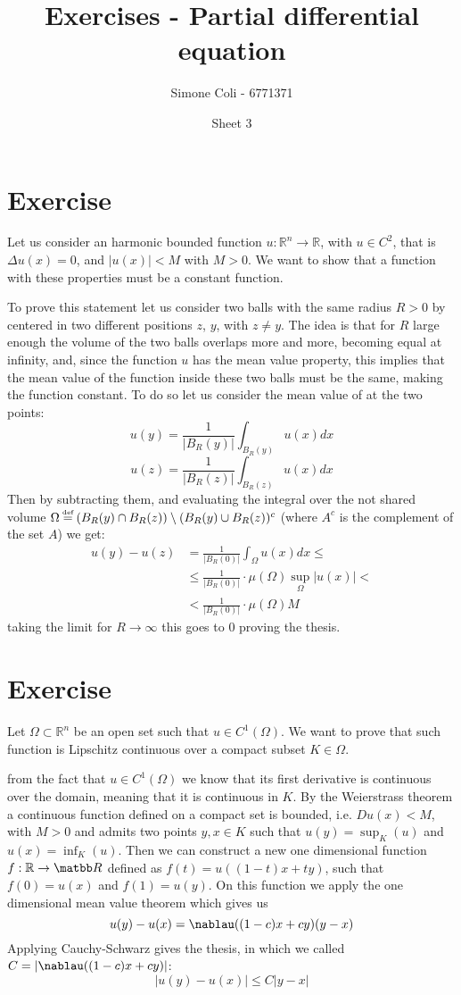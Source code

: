\documentclass{article}
\title{Exercises - Partial differential equation}
\author{Simone Coli - 6771371}
\date{Sheet 3}
\newcommand*{\eqdef}{\ensuremath{\overset{\mathclap{\text{\tiny def}}}{=}}}
\begin{document}
\maketitle
\section{Exercise}
Let us consider an harmonic bounded function $u: \mathbb R^n \to \mathbb R$, with $u \in C^2$, that is $\Delta u(x) = 0$, and $|u(x)|< M$ with $M>0$. We want to show that a function with these properties must be a constant function.

To prove this statement let us consider two balls with the same radius $R>0$ by centered in two different positions $z$, $y$, with $z \neq y$. The idea is that for $R$ large enough the volume of the two balls overlaps more and more, becoming equal at infinity, and, since the function $u$ has the mean value property, this implies that the mean value of the function inside these two balls must be the same, making the function constant. To do so let us consider the mean value of at the two points:
\[
    u(y) = \frac{1}{\left| B_R(y) \right|} \int_{B_R(y)} u(x) dx
\]
\[
    u(z) = \frac{1}{\left| B_R(z) \right|} \int_{B_R(z)} u(x) dx
\]
Then by subtracting them, and evaluating the integral over the not shared volume $\Omega \eqdef (B_R(y) \cap B_R(z)) \setminus (B_R(y)\cup B_R(z))^c$ (where $A^c$ is the complement of the set $A$) we get:
\[
    \begin{split}
        u(y)- u(z) &= \frac{1}{\left| B_R(0) \right|} \int_{\Omega} u(x) dx \leq\\
        & \leq \frac{1}{\left| B_R(0) \right|} \cdot \mu(\Omega) \sup_{\Omega}|u(x)|<\\
        & < \frac{1}{\left| B_R(0) \right|} \cdot \mu(\Omega) M
    \end{split}
\]
taking the limit for $R \to \infty$ this goes to $0$ proving the thesis.

\section{Exercise}
Let $\Omega \subset \mathbb R^n$ be an open set such that $u \in C^1(\Omega)$. We want to prove that such function is Lipschitz continuous over a compact subset $K \in \Omega$.

from the fact that $u \in C^1(\Omega)$ we know that its first derivative is continuous over the domain, meaning that it is continuous in $K$. By the Weierstrass theorem a continuous function defined on a compact set is bounded, i.e. $Du(x) < M$, with $M>0$ and admits two points $y, x \in K$ such that $ u(y) = \sup_K (u)$ and $u(x)=\inf_K(u)$. Then we can construct a new one dimensional function $f : \mathbb R \to \matbb R$ defined as $f(t) = u((1-t)x + ty)$, such that $f(0) = u(x)$ and $f(1)= u(y)$. On this function we apply the one dimensional mean value theorem which gives us
\[
    u(y) - u(x) = \nablau((1-c)x + cy) (y-x) 
\]
Applying Cauchy-Schwarz gives the thesis, in which we called $C = |\nablau((1-c)x + cy)|$:
\[
    |u(y) - u(x)| \leq C |y-x|
\]
\end{document}

